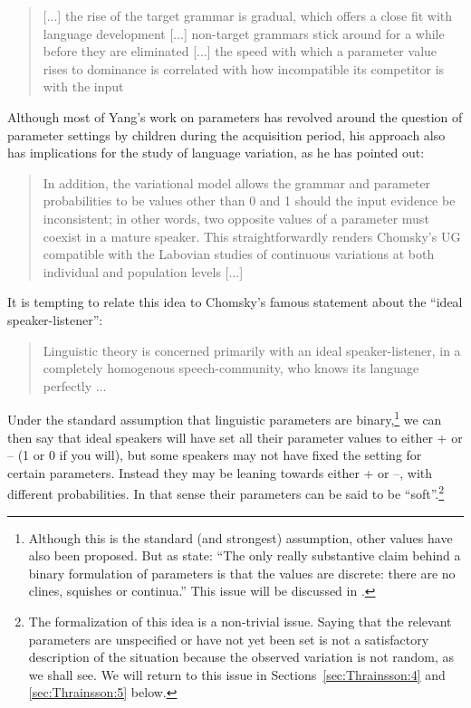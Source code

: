 \documentclass[output=paper]{LSP/langsci}
\begin{document}
\begin{quote}
[...] the rise of the target grammar is gradual, which offers a close fit with language development [...] non-target grammars stick around for a while before they are eliminated [...] the speed with which a parameter value rises to dominance is correlated with how incompatible its competitor is with the input \citep[454]{Yang2004}
\end{quote}

Although most of Yang’s work on parameters has revolved around the question of parameter settings by children during the acquisition period, his approach also has implications for the study of language variation, as he has pointed out:

\begin{quote}
In addition, the variational model allows the grammar and parameter probabilities to be values other than 0 and 1 should the input evidence be inconsistent; in other words, two opposite values of a parameter must coexist in a mature speaker. This straightforwardly renders Chomsky’s UG compatible with the Labovian studies of continuous variations at both individual and population levels [...] \citep[455]{Yang2004}
\end{quote}

It is tempting to relate this idea to Chomsky’s famous statement about the “ideal speaker-listener”:

\begin{quote}
Linguistic theory is concerned primarily with an ideal speaker-listener, in a completely homogenous speech-community, who knows its language perfectly ... \citep[3]{Chomsky1965}
\end{quote}

Under the standard assumption that linguistic parameters are binary,\footnote{Although this is the standard (and strongest) assumption, other values have also been proposed. But as \citet[541]{Roberts2005} state: “The only really substantive claim behind a binary formulation of parameters is that the values are discrete: there are no clines, squishes or continua.” This issue will be discussed in .} we can then say that ideal speakers will have set all their parameter values to either + or – (1 or 0 if you will), but some speakers may not have fixed the setting for certain parameters. Instead they may be leaning towards either + or –, with different probabilities. In that sense their parameters can be said to be “soft”.\footnote{The formalization of this idea is a non-trivial issue. Saying that the relevant parameters are unspecified or have not yet been set is not a satisfactory description of the situation because the observed variation is not random, as we shall see. We will return to this issue in Sections~\ref{sec:Thrainsson:4} and \ref{sec:Thrainsson:5} below.}
\end{document}
